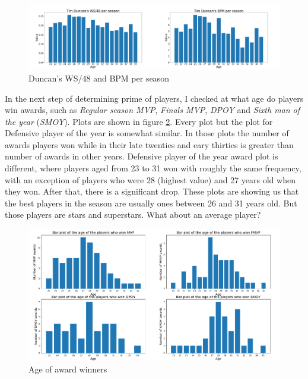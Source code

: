 \documentclass[a4paper]{article}
\begin{document}
\begin{figure}[h!]
\begin{center}
\includegraphics[scale=0.30]{duncan.png}
\end{center}
\caption{Duncan's WS/48 and BPM per season}
\label{plt:duncan}
\end{figure}

In the next step of determining prime of players, I checked at what age do players win awards, such as \textit{Regular season MVP}, \textit{Finals MVP}, \textit{DPOY} and \textit{Sixth man of the year} (\textit{SMOY}). Plots are shown in figure \ref{plt:awards}. Every plot but the plot for Defensive player of the year is somewhat similar. In those plots the number of awards players won while in their late twenties and eary thirties is greater than number of awards in other years. Defensive player of the year award plot is different, where players aged from 23 to 31 won with roughly the same frequency, with an exception of players who were 28 (highest value) and 27 years old when they won. After that, there is a significant drop. These plots are showing us that the best players in the season are usually ones between 26 and 31 years old. But those players are stars and superstars. What about an average player?

\begin{figure}[h!]
\begin{center}
\includegraphics[scale=0.3]{awards_plots.png}
\end{center}
\caption{Age of award winners}
\label{plt:awards}
\end{figure}
\end{document}
